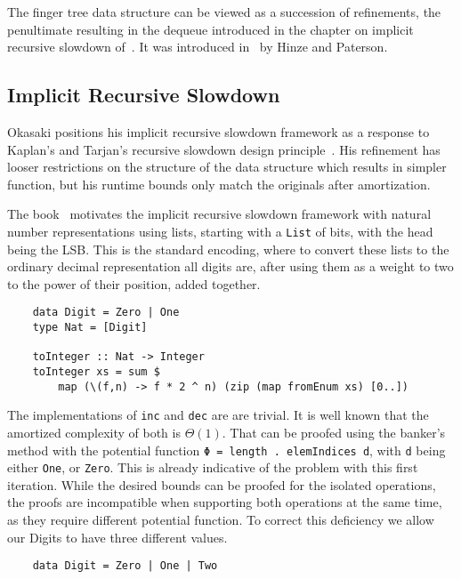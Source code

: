 The finger tree data structure can be viewed as a succession of refinements, the penultimate resulting in the dequeue introduced in the chapter on implicit recursive slowdown of~\cite{okasaki1999purely}. It was introduced in~\cite{hinze_paterson_2006} by Hinze and Paterson.

\subsection{Implicit Recursive Slowdown}

Okasaki positions his implicit recursive slowdown framework as a response to Kaplan's and Tarjan's recursive slowdown design principle~\cite{Kaplan:1995:PLC:225058.225090}. His refinement has looser restrictions on the structure of the data structure which results in simpler function, but his runtime bounds only match the originals after amortization.\par
The book~\cite{okasaki1999purely} motivates the  implicit recursive slowdown framework with natural number representations using lists, starting with a \texttt{List} of bits, with the head being the LSB\@. This is the standard encoding, where to convert these lists to the ordinary decimal representation all digits are, after using them as a weight to two to the power of their position, added together.
\begin{verbatim}
    data Digit = Zero | One
    type Nat = [Digit]

    toInteger :: Nat -> Integer
    toInteger xs = sum $
        map (\(f,n) -> f * 2 ^ n) (zip (map fromEnum xs) [0..])
\end{verbatim}
The implementations of \texttt{inc} and \texttt{dec} are are trivial. It is well known that the amortized complexity of both is \(\Theta(1)\). That can be proofed using the banker's method with the potential function \texttt{Φ = length . elemIndices d}, with \texttt{d} being either \texttt{One}, or \texttt{Zero}. This is already indicative of the problem with this first iteration. While the desired bounds can be proofed for the isolated operations, the proofs are incompatible when supporting both operations at the same time, as they require different potential function. To correct this deficiency we allow our Digits to have three different values.
\begin{verbatim}
    data Digit = Zero | One | Two
\end{verbatim}
